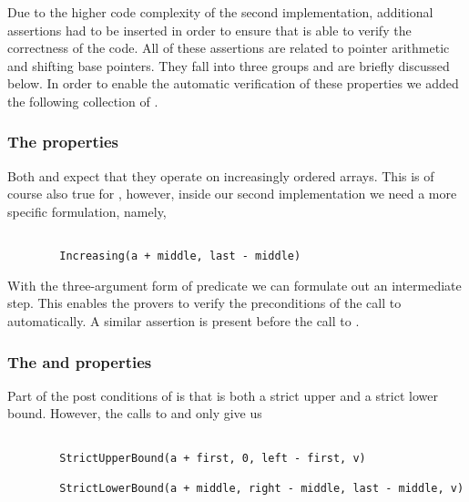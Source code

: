 Due to the higher code complexity of the second implementation, additional
assertions had to be inserted in order to ensure that \wpframac is able to verify the
correctness of the code.
All of these assertions are related to pointer arithmetic and shifting base pointers.
They fall into three groups and are briefly discussed below.
In order to enable the automatic verification of these properties we
added the following collection of .



\subsubsection*{The  properties}

Both  and  expect that they
operate on increasingly ordered arrays.
This is of course also true for , however,
inside our second implementation we need a more specific formulation, namely,

\begin{lstlisting}[style=acsl-block]

        Increasing(a + middle, last - middle)
\end{lstlisting}

With the three-argument form of predicate 
we can formulate out an intermediate step.
This enables the provers to verify the preconditions of the call to
 automatically.
A similar assertion is present before the call to .


\subsubsection*{The  and  properties}

Part of the post conditions of  is that 
is both a strict upper and a strict lower bound.
However, the calls to \lowerbound and \upperbound only give us

\begin{lstlisting}[style=acsl-block]

        StrictUpperBound(a + first, 0, left - first, v) 

        StrictLowerBound(a + middle, right - middle, last - middle, v)
\end{lstlisting}

